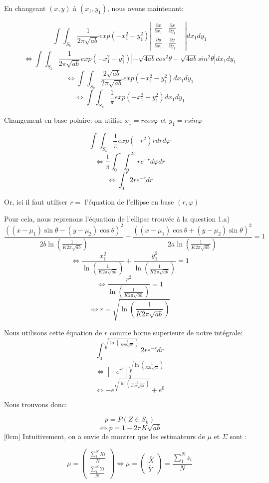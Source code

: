 \documentclass{article}
\begin{document}
En changeant $(x,y)$ à $(x_1,y_1)$, nous avons maintenant:

$$\int\int_{S_k}^{} \frac{1}{2\pi\sqrt{ab}}exp(-x_1^2-y_1^2)\left| \begin{matrix}\frac{\partial x}{\partial x_1}
    &  \frac{\partial x}{\partial y_1}
    &  \\\frac{\partial y}{\partial x_1}
    & \frac{\partial y}{\partial y_1}
\end{matrix} \right|dx_1dy_1$$
$$\Leftrightarrow \int\int_{S_k}^{} \frac{1}{2\pi\sqrt{ab}}exp(-x_1^2-y_1^2)\left| -\sqrt{4ab}cos^2\theta -\sqrt{4ab}sin^2\theta\right|dx_1dy_1$$
$$\Leftrightarrow \int\int_{S_k}^{} \frac{2\sqrt{ab}}{2\pi\sqrt{ab}}exp(-x_1^2-y_1^2)dx_1dy_1$$
$$\Leftrightarrow \int\int_{S_k}^{} \frac{1}{\pi}exp(-x_1^2-y_1^2)dx_1dy_1$$

Changement en base polaire: on utilise $x_1=rcos\varphi$ et $y_1=rsin\varphi$

$$\int\int_{S_k}^{} \frac{1}{\pi}exp(-r^2)rdrd\varphi$$
$$\Leftrightarrow \frac{1}{\pi}\int_{0}^{r}\int_{0}^{2\pi} re^{-r}d\varphi dr$$
$$\Leftrightarrow \int_{0}^{r} 2re^{-r} dr$$

Or, ici il faut utiliser $r=$ l'équation de l'ellipse en base $(r,\varphi)$

Pour cela, nous reprenons l'équation de l'ellipse trouvée à la question 1.a)
$$\frac{((x-\mu_1)\sin\theta-(y-\mu_2)\cos\theta)^{2}}{2b\ln(\frac{1}{K2\pi\sqrt{ab}})}+\frac{((x-\mu_1)\cos\theta+(y-\mu_2)\sin\theta)^{2}}{2a\ln(\frac{1}{K2\pi\sqrt{ab}})}=1$$
$$\Leftrightarrow \frac{x_1^2}{\ln(\frac{1}{K2\pi\sqrt{ab}})}+\frac{y_1^2}{\ln(\frac{1}{K2\pi\sqrt{ab}})}=1$$
$$\Leftrightarrow \frac{r^2}{\ln(\frac{1}{K2\pi\sqrt{ab}})}=1$$
$$\Leftrightarrow r=\sqrt{\ln(\frac{1}{K2\pi\sqrt{ab}})}$$

Nous utilisons cette équation de $r$ comme borne superieure de notre intégrale:
$$\int_{0}^{\sqrt{\ln(\frac{1}{K2\pi\sqrt{ab}})}} 2re^{-r} dr$$
$$\Leftrightarrow \left[ -e^{r^2} \right]_{0}^{\sqrt{\ln(\frac{1}{K2\pi\sqrt{ab}})}}$$
$$\Leftrightarrow -e^{\sqrt{\ln(\frac{1}{K2\pi\sqrt{ab}})}}+e^0$$

Nous trouvons donc:

$$p=P(Z \in S_k)$$
$$\Leftrightarrow p=1-2\pi K\sqrt{ab}$$
\clearpage
\reversemarginpar{}[0cm]
Intuitivement, on a envie de montrer que les estimateurs de $\mu$ et $\Sigma$ sont :

\[
\mu = \begin{pmatrix} \frac{\sum_{1}^{N}Xi}{N} \\ \frac{\sum_{1}^{N}Yi}{N} \end{pmatrix} \Leftrightarrow \mu = \begin{pmatrix} \bar{X} \\ \bar{Y} \end{pmatrix} = \frac{\sum_{1}^{N}z_i}{N}
\]
\end{document}
